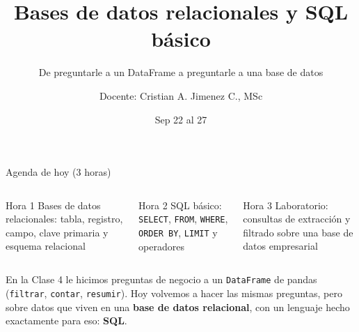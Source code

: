 \documentclass[aspectratio=169,11pt]{beamer}
\title{Bases de datos relacionales y SQL básico}
\subtitle{De preguntarle a un DataFrame a preguntarle a una base de datos}
\author{Docente: Cristian A. Jimenez C., MSc}
\date{Sep 22 al 27}
\begin{document}
{
\begin{frame}[plain]
  \titlepage
\end{frame}
}

\begin{frame}{Agenda de hoy (3 horas)}
  \begin{columns}[T,onlytextwidth]
    \begin{block}{Hora 1}
      \small Bases de datos relacionales: tabla, registro, campo, clave
      primaria y esquema relacional
    \end{block}
    \begin{block}{Hora 2}
      \small SQL básico: \texttt{SELECT}, \texttt{FROM}, \texttt{WHERE},
      \texttt{ORDER BY}, \texttt{LIMIT} y operadores
    \end{block}
    \begin{block}{Hora 3}
      \small Laboratorio: consultas de extracción y filtrado sobre una
      base de datos empresarial
    \end{block}
  \end{columns}
  \vspace{0.4cm}
  \small En la Clase 4 le hicimos preguntas de negocio a un
  \texttt{DataFrame} de pandas (\texttt{filtrar}, \texttt{contar},
  \texttt{resumir}). Hoy volvemos a hacer las mismas preguntas, pero sobre
  datos que viven en una \textbf{base de datos relacional}, con un lenguaje
  hecho exactamente para eso: \textbf{SQL}.
\end{frame}

\end{document}
